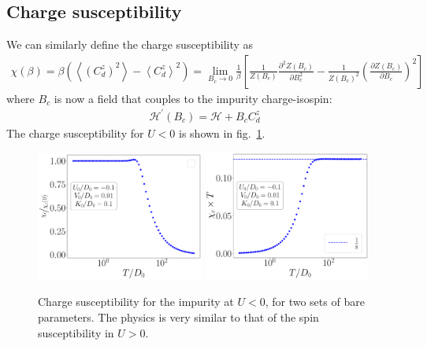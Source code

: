 \documentclass{report}
\numberwithin{equation}{section}
\begin{document}
\subsection{Charge susceptibility}
We can similarly define the charge susceptibility as
\begin{equation}\begin{aligned}
	\label{zero_chi_charge}
	\chi(\beta) = \beta \left(\left<\left(C_d^z\right)^2\right> - \left<C_d^z\right>^2\right) = \lim_{B_c \to 0}\frac{1}{\beta}\left[\frac{1}{Z(B_c)} \frac{\partial^2{Z(B_c)}}{\partial{B_c^2}}-\frac{1}{Z(B_c)^2} \left(\frac{\partial{Z(B_c)}}{\partial{B_c}}\right)^2\right]
\end{aligned}\end{equation}
where \(B_c\) is now a field that couples to the impurity charge-isospin:
\begin{equation}\begin{aligned}
	\label{charge_field}
	\mathcal{H}^\prime(B_c) = \mathcal{H} + B_c C_d^z
\end{aligned}\end{equation}
The charge susceptibility for \(U<0\) is shown in fig.~\ref{chi_charge}.
\begin{figure}[htpb]
	\centering
	\includegraphics[width=0.49\textwidth]{../figures/chic.pdf}
	\includegraphics[width=0.49\textwidth]{../figures/chic_T.pdf}
	\caption{Charge susceptibility for the impurity at \(U<0\), for two sets of bare parameters. The physics is very similar to that of the spin susceptibility in \(U>0\).}
	\label{chi_charge}
\end{figure}
\end{document}
